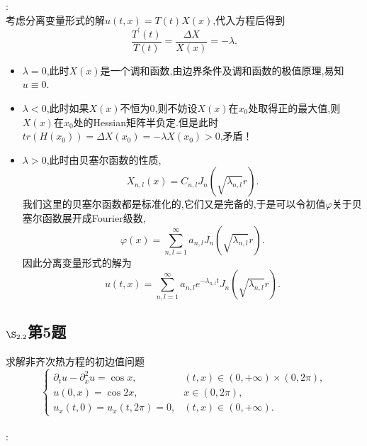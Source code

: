 \documentclass[12pt, a4paper]{ctexbook}
\begin{document}
    \songti{}:\\
    
    考虑分离变量形式的解$u(t,x) = T(t) X(x)$,代入方程后得到
    \begin{equation*}
    \frac{T^{'}(t)}{T(t)} = \frac{\Delta X}{X(x)} = -\lambda.
    \end{equation*}
    \begin{itemize}
        \item $\lambda = 0$,此时$X(x)$是一个调和函数,由边界条件及调和函数的极值原理,易知$u\equiv 0$.
        \item $\lambda < 0$,此时如果$X(x)$不恒为0,则不妨设$X(x)$在$x_0$处取得正的最大值,则$X(x)$在$x_0$处的Hessian矩阵半负定.但是此时$tr(H(x_0)) = \Delta X(x_0) = -\lambda X(x_0) > 0$,矛盾！
        \item $\lambda >0$,此时由贝塞尔函数的性质,
        \begin{equation*}
        X_{n,l}(x) = C_{n,l}J_n(\sqrt{\lambda_{n,l}}r).
        \end{equation*}
        我们这里的贝塞尔函数都是标准化的,它们又是完备的,于是可以令初值$\varphi$关于贝塞尔函数展开成Fourier级数,
        \begin{equation*}
        \varphi(x) = \sum_{n,l=1}^{\infty} a_{n,l}J_n(\sqrt{\lambda_{n,l}}r).
        \end{equation*}
        因此分离变量形式的解为
        \begin{equation*}
        u(t,x) = \sum_{n,l=1}^{\infty} a_{n,l} e^{-\lambda_{n,l} t}J_n(\sqrt{\lambda_{n,l}}r).
        \end{equation*}
    \end{itemize}
    
    \subsection{$\S_{2.2}$第5题}
    \kaishu{}求解非齐次热方程的初边值问题
    \begin{equation*}
    \begin{cases}
    \partial_t u - \partial^2_x u = \cos x, &(t,x) \in (0,+\infty) \times (0,2\pi),\\
    u(0,x) = \cos2x,&x \in(0,2\pi),\\
    u_x(t,0) = u_x(t,2\pi) =0,&(t,x) \in (0,+\infty).
    \end{cases}
    \end{equation*}\\
    
    \songti{}:\\
    
\end{document}
